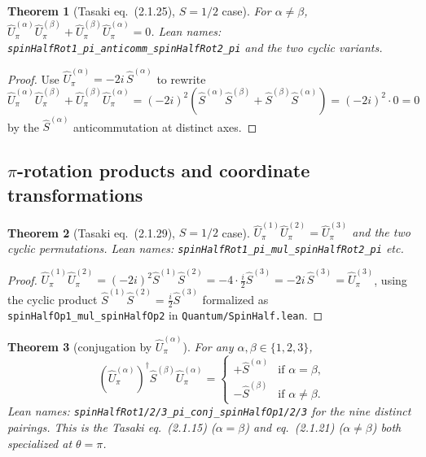 \documentclass[a4paper,11pt]{article}
\newtheorem{theorem}{Theorem}
\begin{document}
\begin{theorem}[Tasaki eq.~(2.1.25), $S = 1/2$ case]
For $\alpha \neq \beta$,
$\hat U^{(\alpha)}_\pi \hat U^{(\beta)}_\pi
  + \hat U^{(\beta)}_\pi \hat U^{(\alpha)}_\pi = 0$.
Lean names: \texttt{spinHalfRot1\_pi\_anticomm\_spinHalfRot2\_pi}
and the two cyclic variants.
\end{theorem}

\begin{proof}
Use $\hat U^{(\alpha)}_\pi = -2i\,\hat S^{(\alpha)}$ to rewrite
\[
  \hat U^{(\alpha)}_\pi \hat U^{(\beta)}_\pi
    + \hat U^{(\beta)}_\pi \hat U^{(\alpha)}_\pi
    = (-2i)^2 (\hat S^{(\alpha)}\hat S^{(\beta)}
      + \hat S^{(\beta)}\hat S^{(\alpha)})
    = (-2i)^2 \cdot 0 = 0
\]
by the $\hat S^{(\alpha)}$ anticommutation at distinct axes.
\end{proof}

\subsection{$\pi$-rotation products and coordinate transformations}

\begin{theorem}[Tasaki eq.~(2.1.29), $S = 1/2$ case]
$\hat U^{(1)}_\pi \hat U^{(2)}_\pi = \hat U^{(3)}_\pi$ and the two
cyclic permutations. Lean names:
\texttt{spinHalfRot1\_pi\_mul\_spinHalfRot2\_pi} etc.
\end{theorem}

\begin{proof}
$\hat U^{(1)}_\pi \hat U^{(2)}_\pi = (-2i)^2 \hat S^{(1)}\hat S^{(2)}
  = -4 \cdot \tfrac{i}{2}\hat S^{(3)} = -2i\,\hat S^{(3)} = \hat U^{(3)}_\pi$,
using the cyclic product $\hat S^{(1)}\hat S^{(2)} = \tfrac{i}{2}\hat S^{(3)}$
formalized as \texttt{spinHalfOp1\_mul\_spinHalfOp2} in
\texttt{Quantum/SpinHalf.lean}.
\end{proof}

\begin{theorem}[conjugation by $\hat U^{(\alpha)}_\pi$]
For any $\alpha, \beta \in \{1, 2, 3\}$,
\[
  (\hat U^{(\alpha)}_\pi)^\dagger \hat S^{(\beta)} \hat U^{(\alpha)}_\pi
    = \begin{cases}
        +\hat S^{(\alpha)} & \text{if } \alpha = \beta, \\
        -\hat S^{(\beta)} & \text{if } \alpha \neq \beta.
      \end{cases}
\]
Lean names: \texttt{spinHalfRot1/2/3\_pi\_conj\_spinHalfOp1/2/3} for
the nine distinct pairings. This is the Tasaki eq.~(2.1.15)
($\alpha = \beta$) and eq.~(2.1.21) ($\alpha \neq \beta$) both
specialized at $\theta = \pi$.
\end{theorem}
\end{document}
